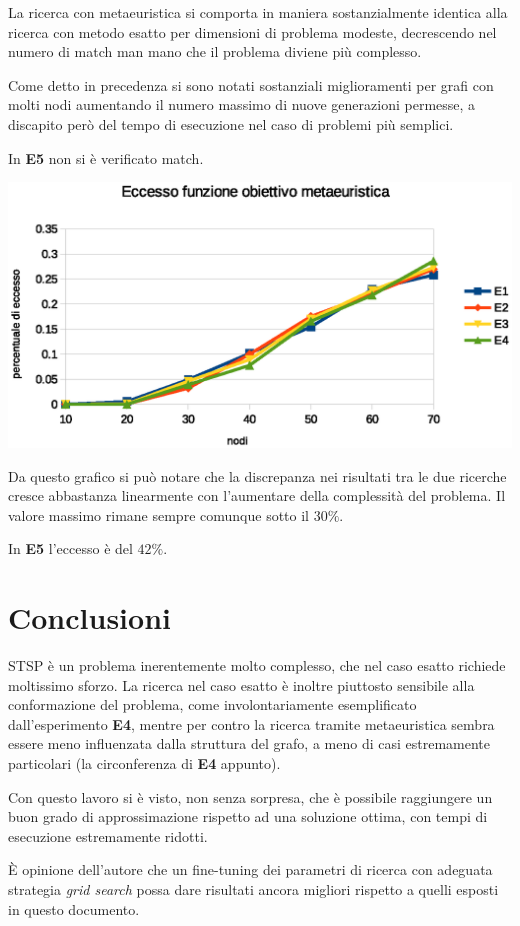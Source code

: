 \documentclass[a4paper]{article}
\begin{document}
                    La ricerca con metaeuristica si comporta in maniera sostanzialmente identica alla ricerca con metodo esatto per dimensioni di problema modeste,
                    decrescendo nel numero di match man mano che il problema diviene pi\`u complesso.
                    
                    Come detto in precedenza si sono notati sostanziali miglioramenti per grafi con molti nodi aumentando il numero massimo di nuove generazioni permesse, a discapito per\`o
                    del tempo di esecuzione nel caso di problemi pi\`u semplici.

                    In \textbf{E5} non si \`e verificato match.

                    \includegraphics[scale=0.7]{img/excess}

                    Da questo grafico si pu\`o notare che la discrepanza nei risultati tra le due ricerche cresce abbastanza linearmente
                    con l'aumentare della complessit\`a del problema.
                    Il valore massimo rimane sempre comunque sotto il $30\%$.


                    In \textbf{E5} l'eccesso \`e del $42\%$.

    \section{Conclusioni}
        STSP \`e un problema inerentemente molto complesso, che nel caso esatto richiede moltissimo sforzo.
        La ricerca nel caso esatto \`e inoltre piuttosto sensibile alla conformazione del problema, come involontariamente esemplificato
        dall'esperimento \textbf{E4}, mentre per contro la ricerca tramite metaeuristica sembra essere meno influenzata dalla struttura del grafo,
        a meno di casi estremamente particolari (la circonferenza di \textbf{E4} appunto).

        Con questo lavoro si \`e visto, non senza sorpresa, che \`e possibile raggiungere un buon grado di approssimazione rispetto ad una
        soluzione ottima, con tempi di esecuzione estremamente ridotti.

        \`E opinione dell'autore che un fine-tuning dei parametri di ricerca con adeguata strategia \emph{grid search} possa dare risultati
        ancora migliori rispetto a quelli esposti in questo documento.
\end{document}
